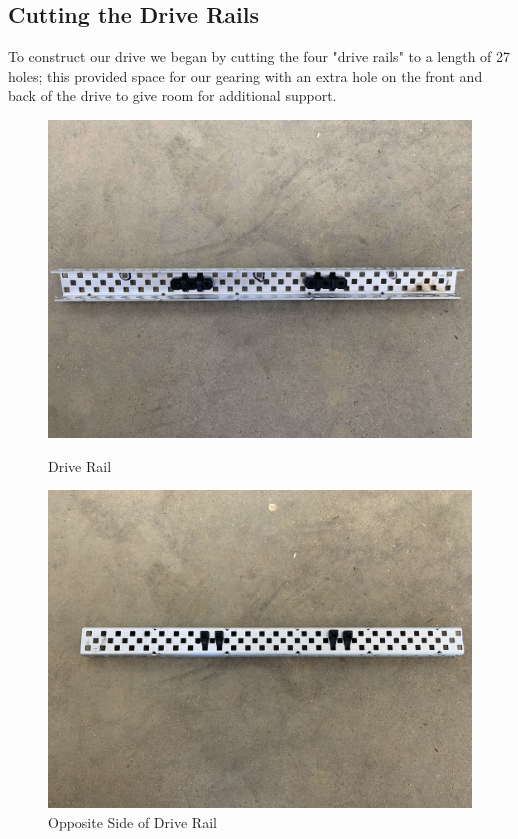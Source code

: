 \subsection*{Cutting the Drive Rails}
To construct our drive we began by cutting the four "drive rails" to a length of 27 holes; this provided space for our gearing with an extra hole on the front and back of the drive to give room for additional support.
\begin{figure}[h]
    \begin{minipage}{.5\textwidth}
        \centering
        \includegraphics[width=.8\linewidth]{images/C Channel w zipties.jpg}
        \caption{Drive Rail}
        \label{fig:c-chanell-w-zipties}
    \end{minipage}
    \begin{minipage}{.5\textwidth}
        \centering
        \includegraphics[width=.8\linewidth]{images/Other side of Drive Rail.jpg}
        \caption{Opposite Side of Drive Rail}
        \label{fig:opposite-side-of-drive}
    \end{minipage}
\end{figure}
